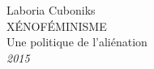 \begin{titlepage}
    \raggedleft
    {\Large Laboria Cuboniks\\[1in]}
    {\Huge\scshape XÉNOFÉMINISME\\[.2in]}
    {\large Une politique de l’aliénation\\}
    \vfill
    {\itshape 2015}
    \end{titlepage}